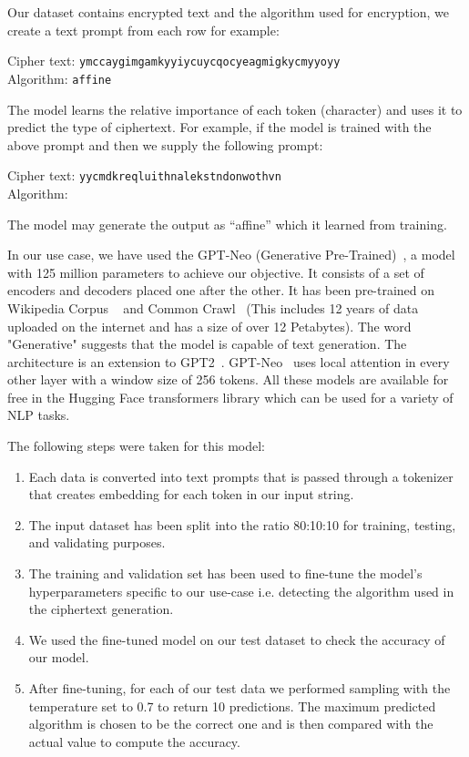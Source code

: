 \documentclass[runningheads]{llncs}
\begin{document}
Our dataset contains encrypted 
text and the algorithm used for encryption, we create a text 
prompt from each row for example: 

\begin{flushleft}
    Cipher text: \texttt{ymccaygimgamkyyiycuycqocyeagmigkycmyyoyy}\\
    Algorithm: \texttt{affine}
\end{flushleft}  

The model learns the relative importance of each token (character) and uses 
it to predict the type of ciphertext. For example, if the model is trained 
with the above prompt and then we supply the following prompt: 

\begin{flushleft}
    Cipher text: \texttt{yycmdkreqluithnalekstndonwothvn}\\
    Algorithm: 
\end{flushleft}  

The model may generate the output as “affine” which it learned 
from training. 

In our use case, we have used the GPT-Neo (Generative Pre-Trained)~\cite{GPTNeo70:online}, 
a model with 125 million parameters to achieve our objective.  
It consists of a set of encoders and decoders placed one after 
the other. It has been pre-trained on Wikipedia Corpus ~\cite{EnglishC48:online}
and Common Crawl~\cite{CommonCr20:online} (This includes 12 years of data uploaded on the internet and has a size of over 12 Petabytes).
The word "Generative" suggests that the model is capable of text generation. The architecture is an extension to GPT2~\cite{radford2019language}. GPT-Neo~\cite{GPTNeo70:online} 
uses local attention in every other layer with a window size 
of 256 tokens. All these models are available for free in the 
Hugging Face \cite{HuggingF50:online} transformers library which can be used for a 
variety of NLP tasks.  

The following steps were taken for this model:
\begin{enumerate}
    \item   Each data is converted into text prompts 
            that is passed through a tokenizer that creates embedding 
            for each token in our input string. 
    \item   The input dataset has been split into the ratio 
            80:10:10 for training, testing, and validating purposes.
    \item   The training and validation set has been used to 
            fine-tune the model’s hyperparameters specific to 
            our use-case i.e. detecting the algorithm used in 
            the ciphertext generation.
    \item   We used the fine-tuned model on our test dataset 
            to check the accuracy of our model. 
    \item   After fine-tuning, for each of our test data we performed sampling with the temperature set to 0.7 to return 10 predictions. The maximum predicted algorithm is chosen to be the correct one and is then compared with the actual value to compute the accuracy.
\end{enumerate}  
\end{document}
